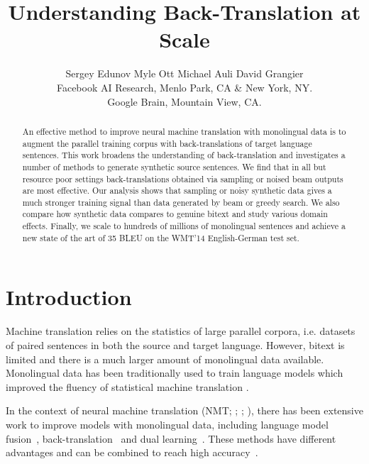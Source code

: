 \documentclass[11pt,a4paper]{article}
\title{Understanding Back-Translation at Scale}
\author{Sergey Edunov
\quad Myle Ott
\quad Michael Auli
\quad David Grangier\hspace{1pt}
\\
Facebook AI Research, Menlo Park, CA \& New York, NY. \quad \\
Google Brain, Mountain View, CA.
}
\date{}
\begin{document}
\maketitle

{\let\thefootnote\relax{}}

\begin{abstract}
An effective method to improve neural machine translation with monolingual data is to augment the parallel training corpus with back-translations of target language sentences.
This work broadens the understanding of back-translation and investigates a number of methods to generate synthetic source sentences.
We find that in all but resource poor settings back-translations obtained via sampling or noised beam outputs are most effective.
Our analysis shows that sampling or noisy synthetic data gives a much stronger training signal than data generated by beam or greedy search.
We also compare how synthetic data compares to genuine bitext and study various domain effects.
Finally, we scale to hundreds of millions of monolingual sentences and achieve a new state of the art of 35 BLEU on the WMT'14 English-German test set.
\end{abstract}


\section{Introduction}

Machine translation relies on the statistics of large parallel corpora, i.e. datasets of paired sentences in both the source and target language.
However, bitext is limited and there is a much larger amount of monolingual data available. 
Monolingual data has been traditionally used to train language models which improved the fluency of statistical machine translation \citep{koehn:book}.

In the context of neural machine translation (NMT; \citealt{bahdanau:attention:2015}; \citealt{gehring:convs2s:2017}; \citealt{vaswani:transformer:2017}), there has been extensive work to improve models with monolingual data, including language model fusion~\cite{gulcehre:lm:2015,gulcehre:lm:2017}, back-translation~\cite{sennrich:backtranslation:2016} and dual learning~\cite{cheng:semi:2016,he:dual:2016}. 
These methods have different advantages and can be combined to reach high accuracy~\cite{hassan:parity:2018}.
\end{document}
